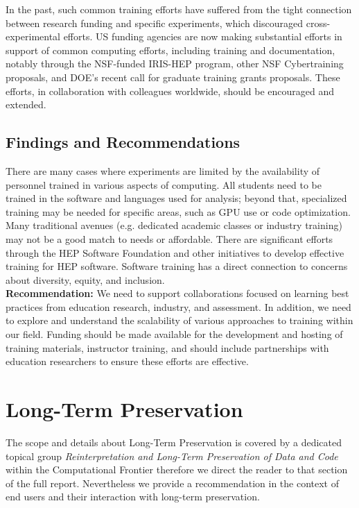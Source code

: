 In the past, such common training efforts have suffered from the  tight connection between research funding and specific experiments, which discouraged cross-experimental efforts. US funding agencies are now making substantial efforts in support of common computing efforts, including training and documentation, notably through the NSF-funded IRIS-HEP program, other NSF Cybertraining proposals, and DOE's recent call for graduate training grants proposals. These efforts, in collaboration with colleagues worldwide, should be encouraged and extended.



\subsection{Findings and Recommendations}
There are many cases where experiments are limited by the availability of personnel trained in various aspects of computing. All students need to be trained in the software and languages used for analysis; beyond that, specialized training may be needed for specific areas, such as GPU use or code optimization. Many traditional avenues (e.g. dedicated academic classes or industry training) may not be a good match to needs or affordable. There are significant efforts through the HEP Software Foundation and other initiatives to develop effective training for HEP software. Software training has a direct connection to concerns about diversity, equity, and inclusion.\\
\textbf{Recommendation:}  We need to support collaborations focused on learning best practices from education research, industry, and assessment. In addition, we need to explore and understand the scalability of various approaches to training within our field.  Funding should be made available for the development and hosting of training materials, instructor training, and should include partnerships with education researchers to ensure these efforts are effective.

\section{Long-Term Preservation}
The scope and details about Long-Term Preservation is covered by a dedicated topical group \textit{Reinterpretation and Long-Term Preservation of Data and Code} within the Computational Frontier therefore we direct the reader to that section of the full report. Nevertheless we provide a recommendation in the context of end users and their interaction with long-term preservation.
